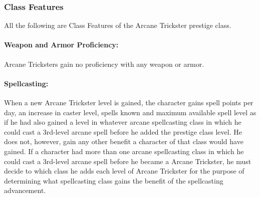 \begin{table*}
\centering
\caption{The Arcane Trickster}
\label{tab:ArcaneTrickster}
\end{table*}

\subsubsection{Class Features}
All the following are Class Features of the Arcane Trickster prestige class.

\paragraph{Weapon and Armor Proficiency:} Arcane Tricksters gain no proficiency with any weapon or armor.

\paragraph{Spellcasting:} When a new Arcane Trickster level is gained, the character gains spell points per day, an increase in caster level, spells known and maximum available spell level as if he had also gained a level in whatever arcane spellcasting class in which he could cast a 3rd-level arcane spell before he added the prestige class level.
He does not, however, gain any other benefit a character of that class would have gained. 
If a character had more than one arcane spellcasting class in which he could cast a 3rd-level arcane spell before he became a Arcane Trickster, he must decide to which class he adds each level of Arcane Trickster for the purpose of determining what spellcasting class gains the benefit of the spellcasting advancement.

